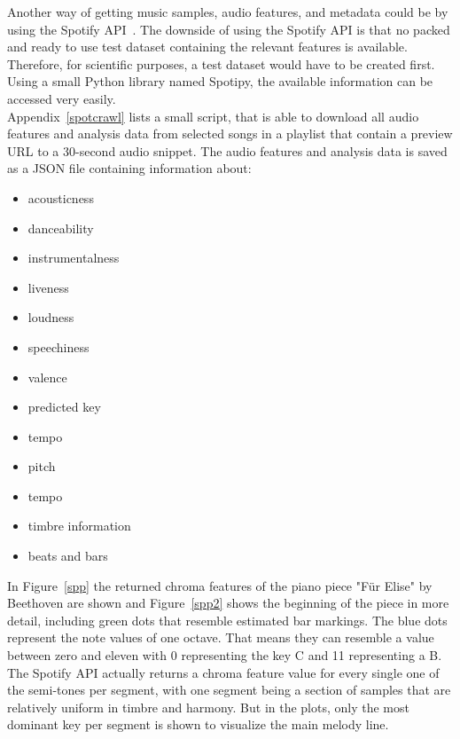 Another way of getting music samples, audio features, and metadata could be by using the Spotify API~\cite{spotifyapi1}.
The downside of using the Spotify API is that no packed and ready to use test dataset containing the relevant features is available. Therefore, for scientific purposes, a test dataset would have to be created first. Using a small Python library named Spotipy, the available information can be accessed very easily.~\cite{spotipy1}\\
Appendix~\ref{spotcrawl} lists a small script, that is able to download all audio features and analysis data from selected songs in a playlist that contain a preview URL to a 30-second audio snippet. The audio features and analysis data is saved as a JSON file containing information about:
\begin{itemize}
	\setlength\itemsep{-0.5em}
	\item acousticness
	\item danceability
	\item instrumentalness
	\item liveness
	\item loudness
	\item speechiness
	\item valence
	\item predicted key
	\item tempo 
	\item pitch 
	\item tempo 
	\item timbre information 
	\item beats and bars 
\end{itemize}
\noindent In Figure~\ref{spp} the returned chroma features of the piano piece "Für Elise" by Beethoven are shown and Figure~\ref{spp2} shows the beginning of the piece in more detail, including green dots that resemble estimated bar markings. The blue dots represent the note values of one octave. That means they can resemble a value between zero and eleven with 0 representing the key C and 11 representing a B. The Spotify API actually returns a chroma feature value for every single one of the semi-tones per segment, with one segment being a section of samples that are relatively uniform in timbre and harmony. But in the plots, only the most dominant key per segment is shown to visualize the main melody line.
